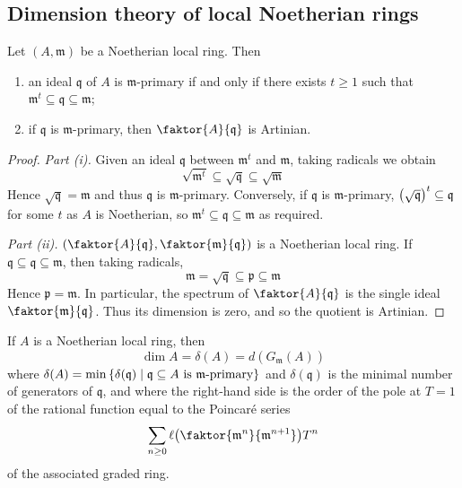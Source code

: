 \subsection{Dimension theory of local Noetherian rings}
\begin{lemma}
    Let \( (A, \mathfrak m) \) be a Noetherian local ring.
    Then
    \begin{enumerate}
        \item an ideal \( \mathfrak q \) of \( A \) is \( \mathfrak m \)-primary if and only if there exists \( t \geq 1 \) such that \( \mathfrak m^t \subseteq \mathfrak q \subseteq \mathfrak m \);
        \item if \( \mathfrak q \) is \( \mathfrak m \)-primary, then \( \faktor{A}{\mathfrak q} \) is Artinian.
    \end{enumerate}
\end{lemma}
\begin{proof}
    \emph{Part (i).}
    Given an ideal \( \mathfrak q \) between \( \mathfrak m^t \) and \( \mathfrak m \), taking radicals we obtain
    \[ \sqrt{\mathfrak m^t} \subseteq \sqrt{\mathfrak q} \subseteq \sqrt{\mathfrak m} \]
    Hence \( \sqrt{\mathfrak q} = \mathfrak m \) and thus \( \mathfrak q \) is \( \mathfrak m \)-primary.
    Conversely, if \( \mathfrak q \) is \( \mathfrak m \)-primary, \( \qty(\sqrt{\mathfrak q})^t \subseteq \mathfrak q \) for some \( t \) as \( A \) is Noetherian, so \( \mathfrak m^t \subseteq \mathfrak q \subseteq \mathfrak m \) as required.

    \emph{Part (ii).}
    \( \qty(\faktor{A}{\mathfrak q}, \faktor{\mathfrak m}{\mathfrak q}) \) is a Noetherian local ring.
    If \( \mathfrak q \subseteq \mathfrak q \subseteq \mathfrak m \), then taking radicals,
    \[ \mathfrak m = \sqrt{\mathfrak q} \subseteq \mathfrak p \subseteq \mathfrak m \]
    Hence \( \mathfrak p = \mathfrak m \).
    In particular, the spectrum of \( \faktor{A}{\mathfrak q} \) is the single ideal \( \faktor{\mathfrak m}{\mathfrak q} \).
    Thus its dimension is zero, and so the quotient is Artinian.
\end{proof}
\begin{theorem}
    If \( A \) is a Noetherian local ring, then
    \[ \dim A = \delta(A) = d(G_{\mathfrak m}(A)) \]
    where \( \delta(A) = \min \qty{\delta(\mathfrak q) \mid \mathfrak q \subseteq A \text{ is } \mathfrak m \text{-primary}} \) and \( \delta(\mathfrak q) \) is the minimal number of generators of \( \mathfrak q \), and where the right-hand side is the order of the pole at \( T = 1 \) of the rational function equal to the Poincar\'e series
    \[ \sum_{n \geq 0} \ell\qty(\faktor{\mathfrak m^n}{\mathfrak m^{n+1}}) T^n \]
    of the associated graded ring.
\end{theorem}

